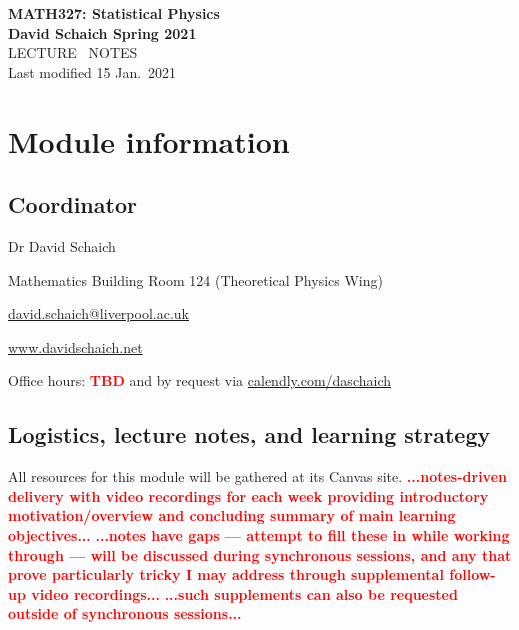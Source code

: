 \documentclass[12 pt]{article} %
\newcommand{\TODO}[1]{\textcolor{red}{\textbf{#1}}}
\begin{document}
\newcommand{\thisweek}{MATH327 information}
\newcommand{\moddate}{Last modified 15 Jan.~2021}
\thispagestyle{empty}
\begin{center}
  {\LARGE \textbf{MATH327: Statistical Physics}} \\[6 pt]
  \textbf{David Schaich \qquad\qquad\qquad\qquad Spring 2021} \\[48 pt]
  {\LARGE LECTURE \ NOTES} \\[6 pt]
  \moddate
\end{center}
\renewcommand{\contentsname}{}
\setcounter{tocdepth}{1}
\tableofcontents



\newpage
\setcounter{section}{0}
\section*{Module information}
\subsection*{Coordinator}
\begin{description}
  \setlength{\itemsep}{1pt}
  \setlength{\parskip}{0pt}
  \setlength{\parsep}{0pt}
  \item[\qquad] Dr David Schaich
  \item[\qquad] Mathematics Building Room 124 (Theoretical Physics Wing)
  \item[\qquad] \href{mailto:david.schaich@liverpool.ac.uk}{david.schaich@liverpool.ac.uk}
  \item[\qquad] \href{http://www.davidschaich.net}{www.davidschaich.net} \\
  \item[\qquad] Office hours: \TODO{TBD} and by request via \href{https://calendly.com/daschaich}{calendly.com/daschaich}
\end{description}



\subsection*{Logistics, lecture notes, and learning strategy}
All resources for this module will be gathered at its Canvas site.
\TODO{...notes-driven delivery with video recordings for each week providing introductory motivation/overview and concluding summary of main learning objectives...}
\TODO{...notes have gaps --- attempt to fill these in while working through --- will be discussed during synchronous sessions, and any that prove particularly tricky I may address through supplemental follow-up video recordings...}
\TODO{...such supplements can also be requested outside of synchronous sessions...} %
\end{document}
